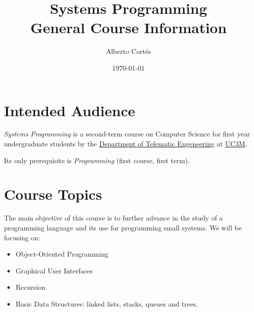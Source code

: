 \documentclass[11pt, a4paper, twoside]{article}
\begin{document}
\title{Systems Programming\\General Course Information}
\author{Alberto Cortés}
\date{\today}
\maketitle


\section{Intended Audience}

\emph{Systems Programming} is a second-term course on Computer Science for
first year undergraduate students by the \href{http://it.uc3m.es}{Department of
Telematic Engeneering} at \href{http://uc3m.es}{UC3M}.


Its only prerequisite is \emph{Programming} (first course, first term).

\section{Course Topics}

The main objective of this course is to further advance in the study of a
programming language and its use for programming small systems. We will be
focusing on:

\begin{itemize}

  \item Object-Oriented Programming

  \item Graphical User Interfaces

  \item Recursion

  \item Basic Data Structures: linked lists, stacks, queues and trees.

\end{itemize}
\end{document}
